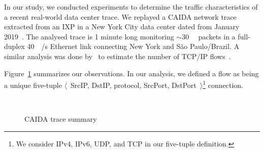 In our study, we conducted experiments to determine the traffic characteristics of a recent real-world data center trace.
We replayed a CAIDA network trace extracted from an IXP in a New York City data center dated from January 2019~\cite{caida:19}.
The analysed trace is 1 minute long monitoring $\sim$\SI{30}{\mega\nothing} packets in a full-duplex \SI{40}{\giga\bit/\second} Ethernet link connecting New York and S\~ao Paulo/Brazil.
A similar analysis was done by~\citeauthor{Spang:19} to estimate the number of TCP/IP flows~\cite{Spang:19}.

Figure~\ref{fig:traces} summarizes our observations.
In our analysis, we defined a flow as being a unique five-tuple $\langle$~SrcIP, DstIP, protocol, SrcPort, DstPort~$\rangle$\footnote{We consider IPv4, IPv6, UDP, and TCP in our five-tuple definition.} connection.

\begin{figure}[!t]
		\centering
		\qquad
		\\
		\qquad
		\caption{CAIDA trace summary}
		\label{fig:traces}
\end{figure}

